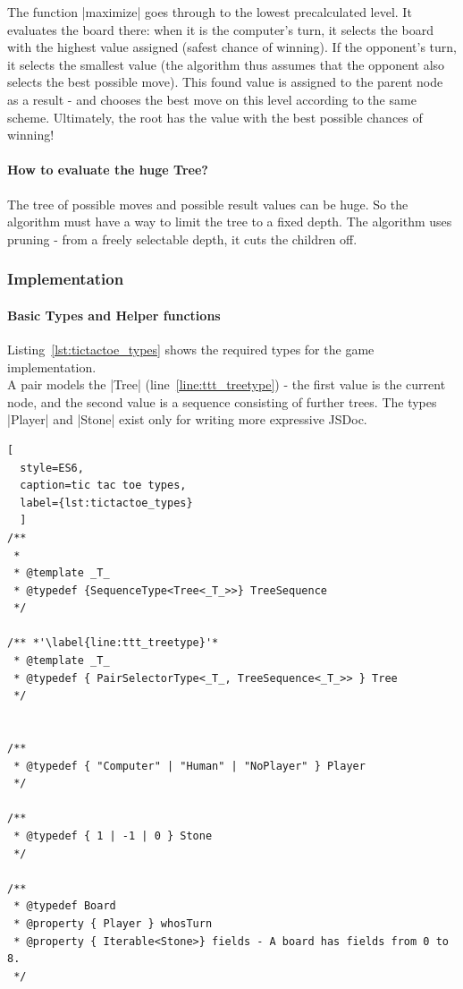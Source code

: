 The function |maximize| goes through to the lowest precalculated level. It
evaluates the board there: when it is the computer's turn, it selects the board with
the highest value assigned (safest chance of winning). If the opponent's turn,
it selects the smallest value (the algorithm thus assumes that the opponent
also selects the best possible move). This found value is assigned to the
parent node as a result - and chooses the best move on this level according to
the same scheme. Ultimately, the root has the value with the best possible
chances of winning!

\paragraph{How to evaluate the huge Tree?} The tree of possible moves and possible
result values can be huge. So the algorithm must have a way to limit the tree
to a fixed depth. The algorithm uses pruning - from a freely selectable depth,
it cuts the children off. 

\subsubsection{Implementation}
\label{subsub:alphabeta_implementation}
\paragraph{Basic Types and Helper functions} 
Listing~\ref{lst:tictactoe_types} shows the required types for the game
implementation. \\
A pair models the |Tree| (line~\ref{line:ttt_treetype}) - the first
value is the current node, and the second value is a sequence consisting of
further trees. The types |Player| and |Stone| exist only for writing more
expressive JSDoc.

\begin{lstlisting}[
  style=ES6, 
  caption=tic tac toe types,
  label={lst:tictactoe_types}
  ]
/**
 * 
 * @template _T_
 * @typedef {SequenceType<Tree<_T_>>} TreeSequence
 */

/** *'\label{line:ttt_treetype}'*
 * @template _T_
 * @typedef { PairSelectorType<_T_, TreeSequence<_T_>> } Tree
 */


/**
 * @typedef { "Computer" | "Human" | "NoPlayer" } Player
 */

/**
 * @typedef { 1 | -1 | 0 } Stone
 */

/**
 * @typedef Board
 * @property { Player } whosTurn
 * @property { Iterable<Stone>} fields - A board has fields from 0 to 8.
 */
\end{lstlisting}

